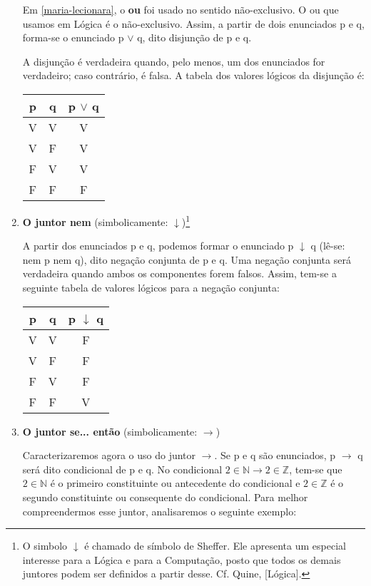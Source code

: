 \begin{enumerate}[label=\textbf{(\arabic*)}]
    Em \ref{maria-lecionara}, o \textbf{ou} foi usado no sentido não-exclusivo.
    O ou que usamos em Lógica é o não-exclusivo.
    Assim, a partir de dois enunciados p e q, forma-se o enunciado p $\lor$ q, dito disjunção de p e q.

    A disjunção é verdadeira quando, pelo menos, um dos enunciados for verdadeiro; caso contrário, é falsa.
    A tabela dos valores lógicos da disjunção é:

    \begin{center}
        \begin{tabular}{c c c}
            p & q & p $\lor$ q \\ \hline
            V & V & V \\
            V & F & V \\
            F & V & V \\
            F & F & F
        \end{tabular}
    \end{center}

    \pagebreak

    \item \textbf{O juntor nem} (simbolicamente: $\downarrow$)\footnote{O simbolo $\downarrow$ é chamado de símbolo de Sheffer.
    Ele apresenta um especial interesse para a Lógica e para a Computação, posto que todos os demais juntores podem ser definidos a partir desse. Cf. Quine, [Lógica].}

    A partir dos enunciados p e q, podemos formar o enunciado p $\downarrow$ q  (lê-se: nem p nem q), dito negação conjunta de p e q.
    Uma negação conjunta será verdadeira quando ambos os componentes forem falsos.
    Assim, tem-se a seguinte tabela de valores lógicos para a negação conjunta:

    \begin{center}
        \begin{tabular}{c c c}
            p & q & p $\downarrow$ q \\ \hline
            V & V & F \\
            V & F & F \\
            F & V & F \\
            F & F & V
        \end{tabular}
    \end{center}

    \item \textbf{O juntor se... então} (simbolicamente: $\to$)

    Caracterizaremos agora o uso do juntor $\to$.
    Se p e q são enunciados, p $\to$ q será dito condicional de p e q.
    No condicional $2 \in \mathbb{N} \to 2 \in \mathbb{Z}$, tem-se que $2 \in \mathbb{N}$ é o primeiro constituinte ou antecedente do condicional e $2 \in \mathbb{Z}$ é o segundo constituinte ou consequente do condicional.
    Para melhor compreendermos esse juntor, analisaremos o seguinte exemplo:


\end{enumerate}
